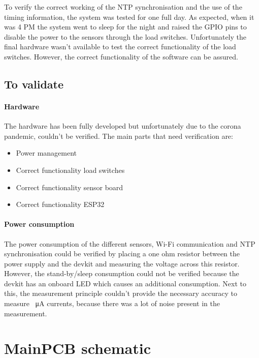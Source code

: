 \documentclass[11pt,a4paper]{article}
\begin{document}
To verify the correct working of the NTP synchronisation and the use of the timing information, the system was tested for one full day. As expected, when it was 4 PM the system went to sleep for the night and raised the GPIO pins to disable the power to the sensors through the load switches. Unfortunately the final hardware wasn't available to test the correct functionality of the load switches. However, the correct functionality of the software can be assured. 


\subsection{To validate}
\paragraph{Hardware}
The hardware has been fully developed but unfortunately due to the corona pandemic, couldn't be verified. The main parts that need verification are:
\begin{itemize}
	\item Power management
	\item Correct functionality load switches
	\item Correct functionality sensor board
	\item Correct functionality ESP32
\end{itemize}

\paragraph{Power consumption}
The power consumption of the different sensors, Wi-Fi communication and NTP synchronisation could be verified by placing a one ohm resistor between the power supply and the devkit and measuring the voltage across this resistor. However, the stand-by/sleep consumption could not be verified because the devkit has an onboard LED which causes an additional consumption. Next to this, the measurement principle couldn't provide the necessary accuracy to measure \SI{}{\micro\ampere} currents, because there was a lot of noise present in the measurement. 

\newpage
	

\newpage
\appendix
\section{MainPCB schematic}\label{app:mainpcb_schematic}

\end{document}
